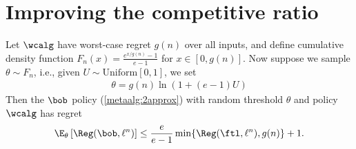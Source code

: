 \section{Improving the competitive ratio} \label{sec:SkiRental}

\begin{theorem}  \label{eq:SkiRentalRegret}
      Let $\wcalg$ have worst-case regret $g(n)$ over all inputs, and define cumulative density function $F_n(x) = \frac{e^{x/g(n)}-1}{e-1}$ for $x\in [0,g(n)]$. Now suppose we sample $\theta\sim F_n$, i.e., given $U\sim\text{Uniform}[0,1]$, we set
      \begin{align*}
      \theta=g(n)\ln(1+(e-1)U)
      \end{align*}
      Then the $\bob$ policy (\cref{metaalg:2approx}) with random threshold $\theta$ and policy $\wcalg$ has regret 
    \begin{align} 
    \label{eq:eApproxReg}
        \E_{\theta}\left[\Reg(\bob, \ell^n)\right] \le \frac{e}{e-1} \min\{\Reg(\ftl,\ell^n),g(n)\} + 1.
    \end{align}
\end{theorem}


